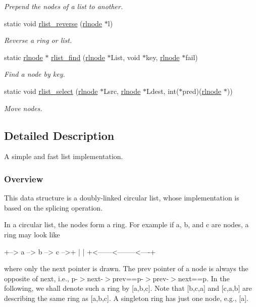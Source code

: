 \begin{DoxyCompactItemize}
\begin{DoxyCompactList}\small\item\em Prepend the nodes of a list to another. \end{DoxyCompactList}\item 
static void \hyperlink{group__rlists_ga3911836f21f2f50b4caa2fa1d8e1f1de}{rlist\+\_\+reverse} (\hyperlink{group__rlists_ga8f6244877f7ce2322c90525217ea6e7a}{rlnode} $\ast$l)
\begin{DoxyCompactList}\small\item\em Reverse a ring or list. \end{DoxyCompactList}\item 
static \hyperlink{group__rlists_ga8f6244877f7ce2322c90525217ea6e7a}{rlnode} $\ast$ \hyperlink{group__rlists_gafbb3a5edeac9f1d43130528292c47cf6}{rlist\+\_\+find} (\hyperlink{group__rlists_ga8f6244877f7ce2322c90525217ea6e7a}{rlnode} $\ast$List, void $\ast$key, \hyperlink{group__rlists_ga8f6244877f7ce2322c90525217ea6e7a}{rlnode} $\ast$fail)
\begin{DoxyCompactList}\small\item\em Find a node by key. \end{DoxyCompactList}\item 
static void \hyperlink{group__rlists_ga6016cbc055d242a03d823ebfec422c2b}{rlist\+\_\+select} (\hyperlink{group__rlists_ga8f6244877f7ce2322c90525217ea6e7a}{rlnode} $\ast$Lsrc, \hyperlink{group__rlists_ga8f6244877f7ce2322c90525217ea6e7a}{rlnode} $\ast$Ldest, int($\ast$pred)(\hyperlink{group__rlists_ga8f6244877f7ce2322c90525217ea6e7a}{rlnode} $\ast$))
\begin{DoxyCompactList}\small\item\em Move nodes. \end{DoxyCompactList}\end{DoxyCompactItemize}


\subsection{Detailed Description}
A simple and fast list implementation. 

\subsubsection*{Overview }

This data structure is a doubly-\/linked circular list, whose implementation is based on the splicing operation.

In a circular list, the nodes form a ring. For example if a, b, and c are nodes, a ring may look like \begin{DoxyVerb}+--> a --> b --> c -->+
|                     |
+<------<--------<----+
\end{DoxyVerb}
 where only the {\ttfamily next} pointer is drawn. The {\ttfamily prev} pointer of a node is always the opposite of {\ttfamily next}, i.\+e., {\ttfamily p-\/$>$next-\/$>$prev==p-\/$>$prev-\/$>$next==p}. In the following, we shall denote such a ring by \mbox{[}a,b,c\mbox{]}. Note that \mbox{[}b,c,a\mbox{]} and \mbox{[}c,a,b\mbox{]} are describing the same ring as \mbox{[}a,b,c\mbox{]}. A singleton ring has just one node, e.\+g., \mbox{[}a\mbox{]}.

